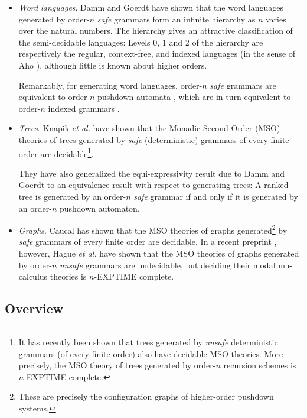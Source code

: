 \begin{itemize}
\item \emph{Word languages}. Damm and Goerdt \cite{DG86} have shown
  that the word languages generated by order-$n$ \emph{safe}
  grammars form an infinite hierarchy as $n$ varies over the
  natural numbers. The hierarchy gives an attractive
  classification of the semi-decidable languages: Levels 0, 1
  and 2 of the hierarchy are respectively the regular,
  context-free, and indexed languages (in the sense of Aho
  \cite{Aho68}), although little is known about higher orders.

  Remarkably, for generating word languages, order-$n$
  \emph{safe} grammars are equivalent to order-$n$ pushdown
  automata \cite{DG86}, which are in turn equivalent to
  order-$n$ indexed grammars \cite{Mas74,Mas76}.

\item \emph{Trees}. Knapik \emph{et al.} have shown that the Monadic
  Second Order (MSO) theories of trees generated by \emph{safe}
  (deterministic) grammars of every finite order are
  decidable\footnote{It has recently been shown
    \cite{OngLics2006} that trees generated by \emph{unsafe}
    deterministic grammars (of every finite order) also have
    decidable MSO theories. More precisely, the MSO theory of
    trees generated by order-$n$
recursion schemes is $n$-EXPTIME complete.}.

  They have also generalized the equi-expressivity result due to
  Damm and Goerdt \cite{DG86} to an equivalence result with
  respect to generating trees: A ranked tree is generated by an
  order-$n$ \emph{safe} grammar if and only if it is generated
  by an order-$n$ pushdown automaton.

\item \emph{Graphs}. Caucal \cite{Cau02} has shown that the MSO
  theories of graphs generated\footnote{These are precisely the
    configuration graphs of higher-order pushdown systems.} by
  \emph{safe} grammars of every finite order are decidable. In a
  recent preprint \cite{hague-sto07}, however, Hague \emph{et
  al.} have shown that the MSO theories of graphs generated by
  order-$n$ \emph{unsafe} grammars are undecidable, but deciding
  their modal mu-calculus theories is $n$-EXPTIME complete.
\end{itemize}

\subsection*{Overview}

